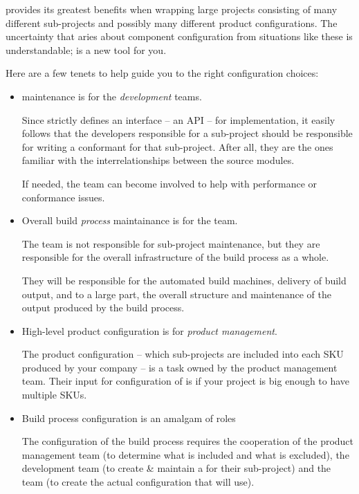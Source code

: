 \lmsbw provides its greatest benefits when wrapping large projects
consisting of many different sub-projects and possibly many different
product configurations.  The uncertainty that aries about component
configuration from situations like these is understandable; \lmsbw is
a new tool for you.

Here are a few tenets to help guide you to the right configuration
choices:

\begin{itemize}
  \item \makefile maintenance is for the \emph{development} teams.

    Since \lmsbw strictly defines an interface -- an API -- for
    \makefile implementation, it easily follows that the developers
    responsible for a sub-project should be responsible for writing a
    conformant \makefile for that sub-project.  After all, they are
    the ones familiar with the interrelationships between the source
    modules.

    If needed, the \bni team can become involved to help with
    performance or conformance issues.

  \item Overall build \emph{process} maintainance is for the
    \emph{\bni} team.

    The \bni team is not responsible for sub-project \makefile
    maintenance, but they are responsible for the overall
    infrastructure of the build process as a whole.

    They will be responsible for the automated build machines,
    delivery of build output, and to a large part, the overall
    structure and maintenance of the output produced by the build
    process.

  \item High-level product configuration is for \emph{product
    management}.

    The product configuration -- which sub-projects are included into
    each SKU produced by your company -- is a task owned by the
    product management team.  Their input for configuration of \lmsbw
    is if your project is big enough to have multiple SKUs.

  \item Build process configuration is an amalgam of roles

    The configuration of the build process requires the cooperation of
    the product management team (to determine what is included and
    what is excluded), the development team (to create \& maintain a
    \makefile for their sub-project) and the \bni team (to create the
    actual configuration that \lmsbw will use).
\end{itemize}

